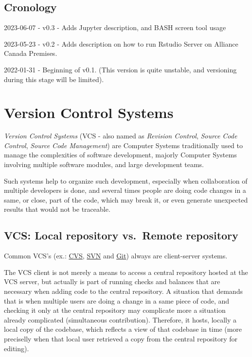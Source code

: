 \documentclass[
]{book}
\begin{document}
\hypertarget{cronology}{%
\section{Cronology}\label{cronology}}

2023-06-07 - v0.3 - Adds Jupyter description, and BASH screen tool usage

2023-05-23 - v0.2 - Adds description on how to run Rstudio Server on Alliance
Canada Premises.

2022-01-31 - Beginning of v0.1. (This version is quite unstable, and versioning
during this stage will be limited).

\hypertarget{version-control-systems}{%
\chapter{Version Control Systems}\label{version-control-systems}}

\emph{Version Control Systems} \citet{wiki_version_control} (VCS - also named as \emph{Revision Control},
\emph{Source Code Control}, \emph{Source Code Management}) are Computer Systems
traditionally used to manage the complexities of software development, majorly
Computer Systems involving multiple software modules, and large development teams.

Such systems help to organize such development, especially when collaboration of
multiple developers is done, and several times people are doing code changes in
a same, or close, part of the code, which may break it, or even generate
unexpected results that would not be traceable.

\hypertarget{vcs-local-repository-vs.-remote-repository}{%
\section{VCS: Local repository vs.~Remote repository}\label{vcs-local-repository-vs.-remote-repository}}

Common VCS's (ex.: \href{https://en.wikipedia.org/wiki/Concurrent_Versions_System}{CVS},
\href{https://en.wikipedia.org/wiki/Concurrent_Versions_System}{SVN} and
\href{https://en.wikipedia.org/wiki/Git}{Git}) always are client-server systems.

The VCS client is not merely a means to access a central repository hosted
at the VCS server, but actually is part of running checks and balances that are
necessary when adding code to the central repository. A situation that demands that
is when multiple users are doing a change in a same piece of code, and checking
it only at the central repository may complicate more a situation already
complicated (simultaneous contribution). Therefore, it hosts, locally
a local copy of the codebase, which reflects a view of that codebase in time
(more preciselly when that local user retrieved a copy from the central repository
for editing).
\end{document}
